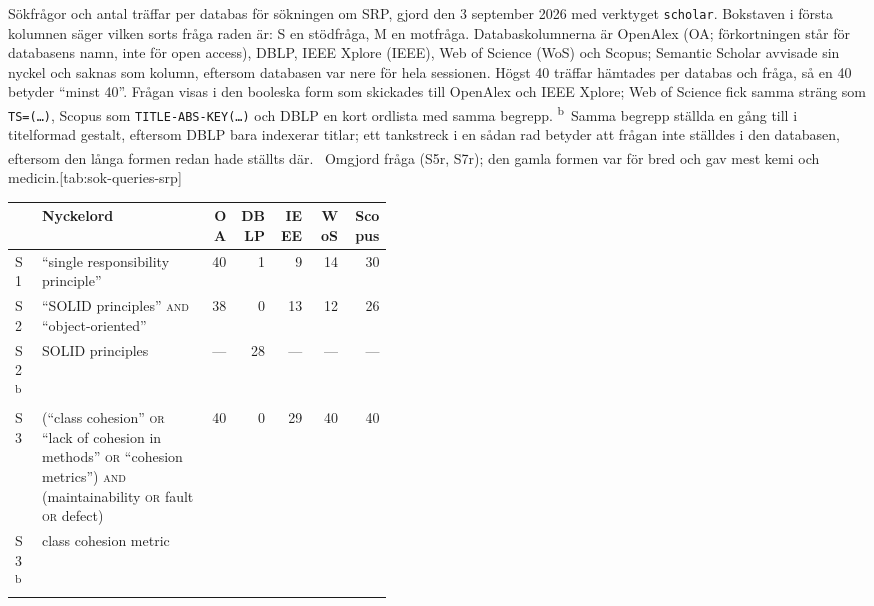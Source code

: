 \begin{table}[htbp]
  \begin{sidecaption}{Sökfrågor och antal träffar per databas för
    sökningen om SRP, gjord den 3 september 2026 med verktyget
    \texttt{scholar}.  Bokstaven i första kolumnen säger vilken sorts
    fråga raden är: S en stödfråga, M en motfråga.  Databaskolumnerna är
    OpenAlex (OA; förkortningen står för databasens namn, inte för
    \foreignlanguage{english}{open access}), DBLP, IEEE Xplore (IEEE),
    Web of Science (WoS) och Scopus; Semantic Scholar avvisade sin nyckel
    och saknas som kolumn, eftersom databasen var nere för hela
    sessionen.  Högst 40 träffar hämtades per databas och fråga, så en 40
    betyder \enquote{minst 40}.  Frågan visas i den booleska form som
    skickades till OpenAlex och IEEE Xplore; Web of Science fick samma
    sträng som \texttt{TS=(\dots)}, Scopus som
    \texttt{TITLE-ABS-KEY(\dots)} och DBLP en kort ordlista med samma
    begrepp.  \textsuperscript{b}~Samma begrepp ställda en gång till i
    titelformad gestalt, eftersom DBLP bara indexerar titlar; ett
    tankstreck i en sådan rad betyder att frågan inte ställdes i den
    databasen, eftersom den långa formen redan hade ställts där.
    \textsuperscript{\dag}~Omgjord fråga (S5r, S7r); den gamla formen
    var för bred och gav mest kemi och medicin.}[tab:sok-queries-srp]
    \centering\footnotesize
    \begin{tabular}{@{}lp{0.44\linewidth}rrrrr@{}}
      \toprule
      & Nyckelord & OA & DBLP & IEEE & WoS & Scopus \\
      \midrule
      S1 & \enquote{single responsibility principle}
         & 40 & 1 & 9 & 14 & 30 \\
      S2 & \enquote{SOLID principles} \textsc{and} \enquote{object-oriented}
         & 38 & 0 & 13 & 12 & 26 \\
      S2\textsuperscript{b} & SOLID principles
         & --- & 28 & --- & --- & --- \\
      S3 & (\enquote{class cohesion} \textsc{or} \enquote{lack of cohesion in methods} \textsc{or} \enquote{cohesion metrics}) \textsc{and} (maintainability \textsc{or} fault \textsc{or} defect)
         & 40 & 0 & 29 & 40 & 40 \\
      S3\textsuperscript{b} & class cohesion metric

\end{tabular}
\end{sidecaption}
\end{table}
